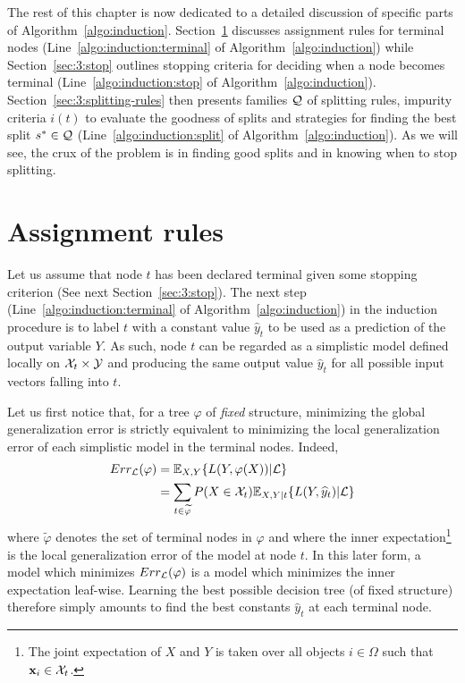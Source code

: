 The rest of this chapter is now dedicated to a detailed discussion of specific
parts of Algorithm~\ref{algo:induction}. Section~\ref{sec:3:assignment}
discusses assignment rules for terminal nodes
(Line~\ref{algo:induction:terminal} of Algorithm~\ref{algo:induction}) while
Section~\ref{sec:3:stop} outlines stopping criteria for deciding when a node
becomes terminal (Line~\ref{algo:induction:stop} of
Algorithm~\ref{algo:induction}). Section~\ref{sec:3:splitting-rules} then
presents families ${\cal Q}$ of splitting rules, impurity criteria $i(t)$ to
evaluate the goodness of splits and strategies for
finding the best split $s^* \in {\cal Q}$ (Line~\ref{algo:induction:split} of
Algorithm~\ref{algo:induction}). As we will see, the crux of the problem is in
finding good splits and in knowing when to stop splitting.


\section{Assignment rules}
\label{sec:3:assignment}

Let us assume that node $t$ has been declared terminal given some stopping
criterion (See next Section~\ref{sec:3:stop}). The next step
(Line~\ref{algo:induction:terminal} of Algorithm~\ref{algo:induction}) in the
induction procedure is to label $t$ with a constant value $\widehat{y}_t$ to
be used as a prediction of the output variable $Y$. As such, node $t$ can  be
regarded as a simplistic model defined locally on ${\cal X}_t \times {\cal Y}$
and producing the same output value $\widehat{y}_t$ for all possible input
vectors falling into $t$.

Let us first notice that, for a tree $\varphi$ of \textit{fixed} structure,
minimizing the global generalization error is strictly equivalent to minimizing
the local generalization error of each simplistic model in the terminal nodes.
Indeed,
\begin{align}
Err_{\cal L}(\varphi) &= \mathbb{E}_{X,Y} \{ L(Y, \varphi(X)) | {\cal L} \} \nonumber \\
                      &= \sum_{t \in \widetilde{\varphi}} P(X \in {\cal X}_t) \mathbb{E}_{X,Y|t} \{ L(Y, \widehat{y}_t) | {\cal L} \} \label{eqn:assignment-generalization}
\end{align}
where $\widetilde{\varphi}$ denotes the set of terminal nodes in $\varphi$
and where the inner expectation\footnote{The joint expectation of $X$ and $Y$
is taken over all objects $i \in \Omega$ such that $\mathbf{x}_i \in {\cal X}_t$.}
is the local generalization error of the model at node $t$. In this later form,
a model which minimizes $Err_{\cal L}(\varphi)$ is a model which minimizes the inner
expectation leaf-wise. Learning the best possible decision tree (of
fixed structure) therefore simply amounts to find the best constants
$\widehat{y}_t$ at each terminal node.

